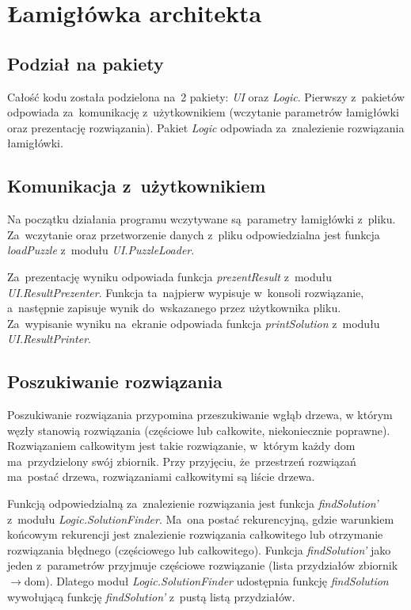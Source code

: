 \documentclass[11pt,a4paper]{article}
\begin{document}
\section*{Łamigłówka architekta}
\subsection*{Podział na pakiety}
Całość kodu została podzielona na~2 pakiety: \textit{UI} oraz \textit{Logic}.
Pierwszy z~pakietów odpowiada za~komunikację z~użytkownikiem (wczytanie
parametrów łamigłówki oraz prezentację rozwiązania). Pakiet \textit{Logic}
odpowiada za~znalezienie rozwiązania łamigłówki.

\subsection*{Komunikacja z~użytkownikiem}
Na początku działania programu wczytywane są~parametry łamigłówki z~pliku.
Za~wczytanie oraz przetworzenie danych z~pliku odpowiedzialna jest funkcja
\textit{loadPuzzle} z~modułu \newline \textit{UI.PuzzleLoader}.

Za~prezentację wyniku odpowiada funkcja \textit{prezentResult} z~modułu
\textit{UI.ResultPrezenter}. Funkcja ta~najpierw wypisuje w~konsoli
rozwiązanie, a~następnie zapisuje wynik do~wskazanego przez użytkownika
pliku. Za~wypisanie wyniku na~ekranie odpowiada funkcja \textit{printSolution}
z~modułu \textit{UI.ResultPrinter}.

\subsection*{Poszukiwanie rozwiązania}
Poszukiwanie rozwiązania przypomina przeszukiwanie wgłąb drzewa, w którym
węzły stanowią rozwiązania (częściowe lub całkowite, niekoniecznie poprawne).
Rozwiązaniem całkowitym jest takie rozwiązanie, w~którym każdy dom
ma~przydzielony swój zbiornik. Przy przyjęciu, że~przestrzeń rozwiązań
ma~postać drzewa, rozwiązaniami całkowitymi są liście drzewa.

Funkcją odpowiedzialną za~znalezienie rozwiązania jest funkcja
\textit{findSolution'} z~modułu \textit{Logic.SolutionFinder}. Ma~ona postać
rekurencyjną, gdzie warunkiem końcowym rekurencji jest znalezienie rozwiązania
całkowitego lub otrzymanie rozwiązania błędnego (częściowego lub całkowitego).
Funkcja \textit{findSolution'} jako jeden z~parametrów przyjmuje częściowe
rozwiązanie (lista przydziałów zbiornik$\rightarrow$dom). Dlatego moduł
\textit{Logic.SolutionFinder} udostępnia funkcję \textit{findSolution}
wywołującą funkcję \textit{findSolution'} z~pustą listą przydziałów.
\end{document}
